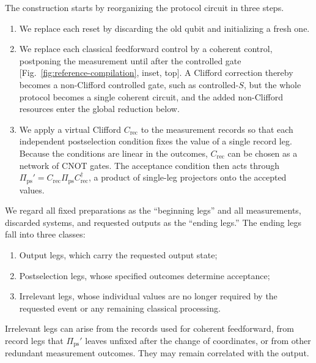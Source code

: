 \documentclass[aps,prx,twocolumn,superscriptaddress,longbibliography]{revtex4-2}
\begin{document}
The construction starts by reorganizing the protocol circuit in three steps.
\begin{enumerate}
      \item We replace each reset by discarding the old qubit and initializing a fresh one.
      \item We replace each classical feedforward control by a coherent control,
      postponing the measurement until after the controlled gate
      [Fig.~\ref{fig:reference-compilation}, inset, top].
      A Clifford correction thereby becomes a non-Clifford controlled gate, such as controlled-$S$,
      but the whole protocol becomes a single coherent circuit,
      and the added non-Clifford resources enter the global reduction below.
      \item We apply a virtual Clifford $C_{\text{rec}}$ to the measurement records
      so that each independent postselection condition fixes the value of a single record leg.
      Because the conditions are linear in the outcomes, $C_{\text{rec}}$ can be chosen as a network of CNOT gates.
      The acceptance condition then acts through $\Pi_{\text{ps}}'=C_{\text{rec}}\Pi_{\text{ps}}C_{\text{rec}}^\dagger$,
      a product of single-leg projectors onto the accepted values.
\end{enumerate}
We regard all fixed preparations as the ``beginning legs''
and all measurements, discarded systems, and requested outputs as the ``ending legs.''
The ending legs fall into three classes:
\begin{enumerate}
      \item Output legs, which carry the requested output state;
      \item Postselection legs, whose specified outcomes determine acceptance;
      \item Irrelevant legs, whose individual values are no longer required by the requested event or any remaining classical processing.
\end{enumerate}
Irrelevant legs can arise from the records used for coherent feedforward,
from record legs that $\Pi_{\text{ps}}'$ leaves unfixed after the change of coordinates,
or from other redundant measurement outcomes.
They may remain correlated with the output.
\end{document}
